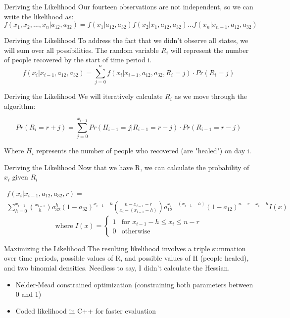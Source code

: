 \documentclass[10pt,table]{beamer}
\begin{document}
\begin{frame}{Deriving the Likelihood}
Our fourteen observations are not independent, so we can write the likelihood as: 
$$
f(x_1, x_2,...,x_n| a_{12}, a_{32}) = f(x_1| a_{12}, a_{32}) f(x_2|x_1, a_{12}, a_{32}) ... f(x_n|x_{n-1}, a_{12}, a_{32})
$$
\end{frame}

\begin{frame}{Deriving the Likelihood}
To address the fact that we didn't observe all states, we will sum over all possibilities. The random variable $R_i$ will represent the number of people recovered by the start of time period i.
$$
f(x_i | x_{i-1}, a_{12}, a_{32}) =\sum_{j=0}^n f(x_i | x_{i-1}, a_{12}, a_{32}, R_i=j)\cdot Pr(R_i=j) 
\label{sum}
$$
\end{frame}


\begin{frame}{Deriving the Likelihood}
We will iteratively calculate $R_i$ as we move through the algorithm:

$$
Pr(R_i = r + j) = \sum_{j=0}^{x_{i-1}} Pr(H_{i-1}=j|R_{i-1}=r-j)\cdot Pr(R_{i-1}=r-j)
$$

Where $H_i$ represents the number of people who recovered (are "healed") on day i.
\end{frame}

\begin{frame}{Deriving the Likelihood}
Now that we have R, we can calculate the probability of $x_i$ given $R_i$

\begin{multline*}
f(x_i|x_{i-1}, a_{12}, a_{32}, r) = \\ \sum_{h=0}^{x_{i-1}}       {{x_{i-1}}\choose{h}} a_{32}^h(1-a_{32})^{x_{i-1}-h}  {{n-x_{i-1}-r}\choose{x_i-(x_{i-1}-h)}}  a_{12}^{x_i-(x_{i-1}-h)} (1-a_{12})^{n - r - x_i-h}I(x)  \end{multline*} $$
\text{where } I(x) = \begin{cases} 1 & \text{for } x_{i-1}-h\leq x_i\leq n-r  \\ 0 &\text{otherwise} \end{cases}$$


\end{frame}
\begin{frame}{Maximizing the Likelihood}
The resulting likelihood involves a triple summation over time periods, possible values of R, and possible values of H (people healed), and two binomial densities. Needless to say, I didn't calculate the Hessian. 
\begin{itemize}
\item Nelder-Mead constrained optimization (constraining both parameters between 0 and 1)
\item Coded likelihood in C++ for faster evaluation
\end{itemize}

\end{frame}
\end{document}

